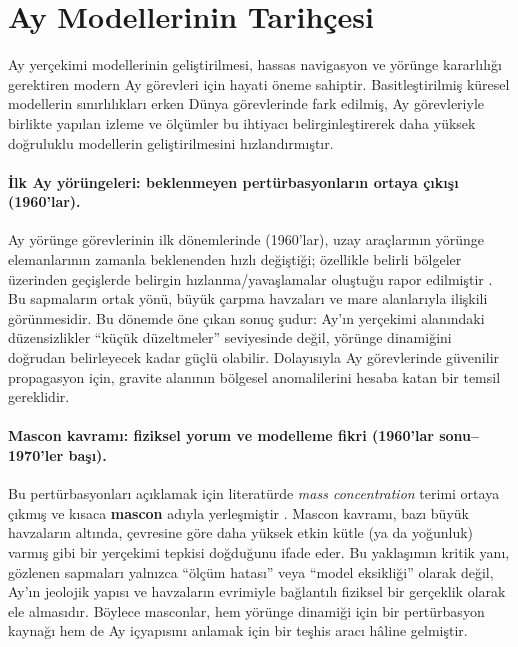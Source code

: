 \newpage
\section{Ay Modellerinin Tarihçesi}

Ay yerçekimi modellerinin geliştirilmesi, hassas navigasyon ve yörünge kararlılığı gerektiren modern Ay görevleri için hayati öneme sahiptir. Basitleştirilmiş küresel modellerin sınırlılıkları erken Dünya görevlerinde fark edilmiş, Ay görevleriyle birlikte yapılan izleme ve ölçümler bu ihtiyacı belirginleştirerek daha yüksek doğruluklu modellerin geliştirilmesini hızlandırmıştır.


\paragraph{İlk Ay yörüngeleri: beklenmeyen pertürbasyonların ortaya çıkışı (1960'lar).}
Ay yörünge görevlerinin ilk dönemlerinde (1960’lar), uzay araçlarının yörünge elemanlarının zamanla beklenenden hızlı değiştiği; özellikle belirli bölgeler üzerinden geçişlerde belirgin hızlanma/yavaşlamalar oluştuğu rapor edilmiştir \cite{Muller1968}. Bu sapmaların ortak yönü, büyük çarpma havzaları ve mare alanlarıyla ilişkili görünmesidir. Bu dönemde öne çıkan sonuç şudur: Ay’ın yerçekimi alanındaki düzensizlikler ``küçük düzeltmeler'' seviyesinde değil, yörünge dinamiğini doğrudan belirleyecek kadar güçlü olabilir. Dolayısıyla Ay görevlerinde güvenilir propagasyon için, gravite alanının bölgesel anomalilerini
hesaba katan bir temsil gereklidir.

\paragraph{Mascon kavramı: fiziksel yorum ve modelleme fikri (1960'lar sonu--1970'ler başı).}
Bu pertürbasyonları açıklamak için literatürde \emph{mass concentration} terimi ortaya çıkmış ve kısaca \textbf{mascon} adıyla yerleşmiştir \cite{Muller1968}. Mascon kavramı, bazı büyük havzaların altında, çevresine göre daha yüksek etkin kütle (ya da yoğunluk) varmış gibi bir yerçekimi tepkisi doğduğunu ifade eder. Bu yaklaşımın kritik yanı, gözlenen sapmaları yalnızca ``ölçüm hatası'' veya ``model eksikliği'' olarak değil, Ay’ın jeolojik yapısı ve havzaların evrimiyle bağlantılı fiziksel bir gerçeklik olarak ele almasıdır. Böylece masconlar, hem yörünge dinamiği için bir pertürbasyon kaynağı hem de Ay içyapısını anlamak için
bir teşhis aracı hâline gelmiştir.

